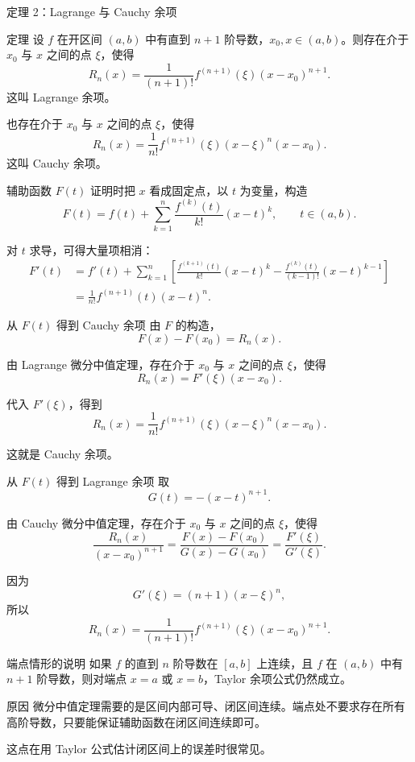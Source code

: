 \documentclass[aspectratio=169,11pt]{ctexbeamer}
\begin{document}
\begin{frame}{定理 2：Lagrange 与 Cauchy 余项}
\footnotesize
\begin{block}{定理}
设 $f$ 在开区间 $(a,b)$ 中有直到 $n+1$ 阶导数，$x_0,x\in(a,b)$。则存在介于 $x_0$ 与 $x$ 之间的点 $\xi$，使得
\[
  R_n(x)=\frac{1}{(n+1)!}f^{(n+1)}(\xi)(x-x_0)^{n+1}.
\]
这叫 Lagrange 余项。

也存在介于 $x_0$ 与 $x$ 之间的点 $\xi$，使得
\[
  R_n(x)=\frac{1}{n!}f^{(n+1)}(\xi)(x-\xi)^n(x-x_0).
\]
这叫 Cauchy 余项。
\end{block}
\end{frame}

\begin{frame}{辅助函数 $F(t)$}
\small
证明时把 $x$ 看成固定点，以 $t$ 为变量，构造
\[
  F(t)=f(t)+\sum_{k=1}^n
  \frac{f^{(k)}(t)}{k!}(x-t)^k,\qquad t\in(a,b).
\]

对 $t$ 求导，可得大量项相消：
\[
\begin{aligned}
F'(t)
&=f'(t)+\sum_{k=1}^n
\left[
\frac{f^{(k+1)}(t)}{k!}(x-t)^k
-\frac{f^{(k)}(t)}{(k-1)!}(x-t)^{k-1}
\right] \\
&=\frac1{n!}f^{(n+1)}(t)(x-t)^n.
\end{aligned}
\]
\end{frame}

\begin{frame}{从 $F(t)$ 得到 Cauchy 余项}
\small
由 $F$ 的构造，
\[
  F(x)-F(x_0)=R_n(x).
\]

由 Lagrange 微分中值定理，存在介于 $x_0$ 与 $x$ 之间的点 $\xi$，使得
\[
  R_n(x)=F'(\xi)(x-x_0).
\]

代入 $F'(\xi)$，得到
\[
  R_n(x)=\frac1{n!}f^{(n+1)}(\xi)(x-\xi)^n(x-x_0).
\]

这就是 Cauchy 余项。
\end{frame}

\begin{frame}{从 $F(t)$ 得到 Lagrange 余项}
\small
取
\[
  G(t)=-(x-t)^{n+1}.
\]

由 Cauchy 微分中值定理，存在介于 $x_0$ 与 $x$ 之间的点 $\xi$，使得
\[
  \frac{R_n(x)}{(x-x_0)^{n+1}}
  =
  \frac{F(x)-F(x_0)}{G(x)-G(x_0)}
  =
  \frac{F'(\xi)}{G'(\xi)}.
\]

因为
\[
  G'(\xi)=(n+1)(x-\xi)^n,
\]
所以
\[
  R_n(x)=\frac{1}{(n+1)!}f^{(n+1)}(\xi)(x-x_0)^{n+1}.
\]
\end{frame}

\begin{frame}{端点情形的说明}
\small
如果 $f$ 的直到 $n$ 阶导数在 $[a,b]$ 上连续，且 $f$ 在 $(a,b)$ 中有 $n+1$ 阶导数，则对端点 $x=a$ 或 $x=b$，Taylor 余项公式仍然成立。

\begin{block}{原因}
微分中值定理需要的是区间内部可导、闭区间连续。端点处不要求存在所有高阶导数，只要能保证辅助函数在闭区间连续即可。
\end{block}

这点在用 Taylor 公式估计闭区间上的误差时很常见。
\end{frame}
\end{document}
